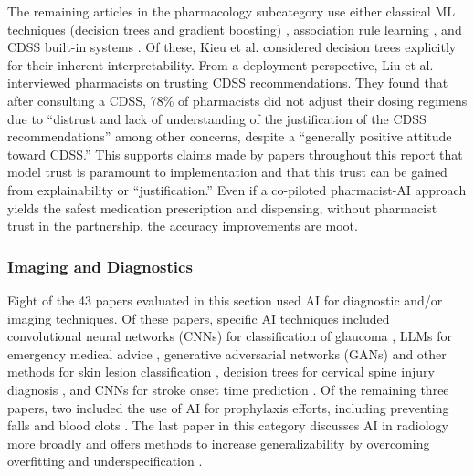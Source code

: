 \documentclass[authoryear,preprint,12pt]{elsarticle}
\begin{document}
The remaining articles in the pharmacology subcategory use either classical ML
techniques (decision trees and gradient boosting)
\cite{kieuDevelopmentValidationMachine2024,buckerArtificialIntelligenceAssist2024,cornyMachineLearningbasedClinical2020}, association rule learning
\cite{chenAbilityMachinelearningBased2024}, and CDSS built-in systems
\cite{nimriInsulinDoseOptimization2020,liuDiscrepancyPerceptionsAcceptance2023}. Of these, Kieu et al.
\cite{kieuDevelopmentValidationMachine2024} considered decision trees explicitly
for their inherent interpretability. From a deployment perspective, Liu et al.
\cite{liuDiscrepancyPerceptionsAcceptance2023} interviewed pharmacists on
trusting CDSS recommendations. They found that after consulting a CDSS, 78\% of
pharmacists did not adjust their dosing regimens due to ``distrust and lack of
understanding of the justification of the CDSS recommendations'' among other
concerns, despite a ``generally positive attitude toward CDSS.'' This supports
claims made by papers throughout this report that model trust is paramount to
implementation and that this trust can be gained from explainability or
``justification.'' Even if a co-piloted pharmacist-AI approach yields the safest
medication prescription and dispensing, without pharmacist trust in the
partnership, the accuracy improvements are moot. 

\subsubsection{Imaging and Diagnostics}
Eight of the 43 papers evaluated in this section used AI for diagnostic and/or
imaging techniques. Of these papers, specific AI techniques included
convolutional neural networks (CNNs) for classification of glaucoma
\cite{vieiraExploringTransparencyComparative2025}, LLMs for emergency medical
advice \cite{yauAccuracyProspectiveAssessments2024}, generative adversarial
networks (GANs) and other methods for skin lesion classification
\cite{mettaAdvancingDermatologicalDiagnostics2024}, decision trees for cervical
spine injury diagnosis \cite{bertsimasPredictionCervicalSpine2019}, and CNNs for
stroke onset time prediction \cite{akayDeepLearningAnalysis2023}. Of the
remaining three papers, two included the use of AI for prophylaxis efforts,
including preventing falls \cite{wooEvaluationMLbasedClinical2020} and blood
clots \cite{zhouRetrospectiveStudyEffectiveness2021}. The last paper in this
category discusses AI in radiology more broadly and offers methods to increase
generalizability by overcoming overfitting and underspecification
\cite{echeGeneralizabilityDeploymentArtificial2021}. 
\end{document}
